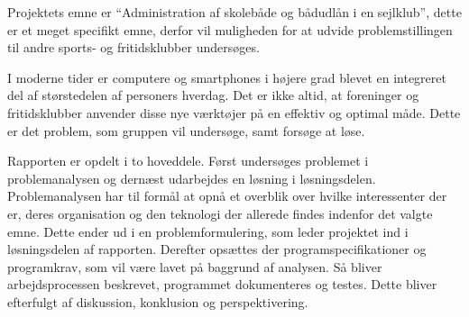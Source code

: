 Projektets emne er ``Administration af skolebåde og bådudlån i en sejlklub'', dette er et meget specifikt
emne, derfor vil  muligheden for at udvide problemstillingen til andre sports- og fritidsklubber undersøges.

I moderne tider er computere og smartphones i højere grad blevet en integreret del af størstedelen af
personers hverdag. \citep{dstSPogPC} Det er ikke altid, at foreninger og fritidsklubber anvender disse nye
værktøjer på en effektiv og optimal måde. Dette er det problem, som gruppen vil undersøge, samt forsøge at løse.

Rapporten er opdelt i to hoveddele. Først undersøges problemet i problemanalysen og dernæst udarbejdes en
løsning i løsningsdelen. Problemanalysen har til formål at opnå et overblik over hvilke interessenter der er,
deres organisation og den teknologi der allerede findes indenfor det valgte emne. 
Dette ender ud i en problemformulering, som leder projektet ind i løsningsdelen af rapporten. 
Derefter opsættes der programspecifikationer og programkrav, som vil være lavet på baggrund af analysen. 
Så bliver arbejdsprocessen beskrevet, programmet dokumenteres og testes. 
Dette bliver efterfulgt af diskussion, konklusion og perspektivering.

